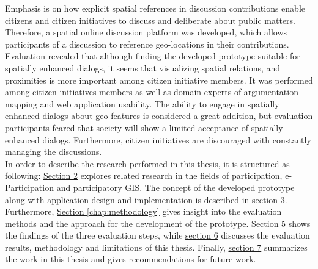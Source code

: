 Emphasis is on how explicit spatial references in discussion contributions enable citizens and citizen initiatives to discuss and deliberate about public matters. Therefore, a spatial online discussion platform was developed, which allows participants of a discussion to reference geo-locations in their contributions. Evaluation revealed that although finding the developed prototype suitable for spatially enhanced dialogs, it seems that visualizing spatial relations, and proximities is more important among citizen initiative members. It was performed among citizen initiatives members as well as domain experts of argumentation mapping and web application usability. The ability to engage in spatially enhanced dialogs about geo-features is considered a great addition, but evaluation participants feared that society will show a limited acceptance of spatially enhanced dialogs. Furthermore, citizen initiatives are discouraged with constantly managing the discussions.\\
In order to describe the research performed in this thesis, it is structured as following: \hyperref[chap:related_work]{Section 2} explores related research in the fields of participation, e-Participation and participatory GIS. The concept of the developed prototype along with application design and implementation is described in \hyperref[chap:approach]{section 3}. Furthermore, \hyperref[chap:methodology]{Section \ref{chap:methodology}} gives insight into the evaluation methods and the approach for the development of the prototype. \hyperref[chap:methodology]{Section 5} shows the findings of the three evaluation steps, while \hyperref[chap:discussion]{section 6} discusses the evaluation results, methodology and limitations of this thesis. Finally, \hyperref[chap:conclusion]{section 7} summarizes the work in this thesis and gives recommendations for future work.
